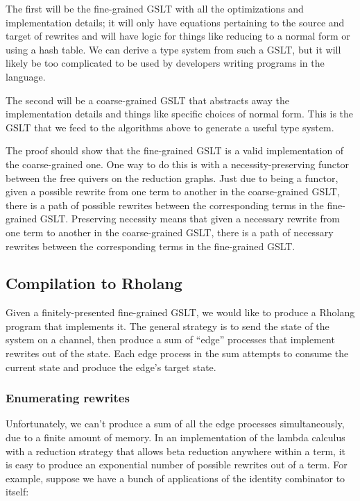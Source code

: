 \documentclass{article}
\begin{document}
The first will be the fine-grained GSLT with all the optimizations and implementation details; it will only have equations pertaining to the source and target of rewrites and will have logic for things like reducing to a normal form or using a hash table.  We can derive a type system from such a GSLT, but it will likely be too complicated to be used by developers writing programs in the language.

The second will be a coarse-grained GSLT that abstracts away the implementation details and things like specific choices of normal form.  This is the GSLT that we feed to the algorithms above to generate a useful type system.

The proof should show that the fine-grained GSLT is a valid implementation of the coarse-grained one.  One way to do this is with a necessity-preserving functor between the free quivers on the reduction graphs.  Just due to being a functor, given a possible rewrite from one term to another in the coarse-grained GSLT, there is a path of possible rewrites between the corresponding terms in the fine-grained GSLT. Preserving necessity means that given a necessary rewrite from one term to another in the coarse-grained GSLT, there is a path of necessary rewrites between the corresponding terms in the fine-grained GSLT.

\subsection{Compilation to Rholang}
\label{comp_to_rholang}

Given a finitely-presented fine-grained GSLT, we would like to produce a Rholang program that implements it.  The general strategy is to send the state of the system on a channel, then produce a sum of ``edge'' processes that implement rewrites out of the state.  Each edge process in the sum attempts to consume the current state and produce the edge's target state.

\subsubsection{Enumerating rewrites}
\label{enum_rewrites}

Unfortunately, we can't produce a sum of all the edge processes simultaneously, due to a finite amount of memory.  In an implementation of the lambda calculus with a reduction strategy that allows beta reduction anywhere within a term, it is easy to produce an exponential number of possible rewrites out of a term.  For example, suppose we have a bunch of applications of the identity combinator to itself:
\end{document}
